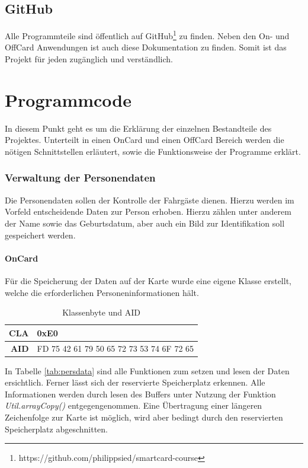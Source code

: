 \documentclass[	a4paper,
			11pt,
			oneside,
			parskip]{scrartcl}
\begin{document}
\subsection{GitHub}

Alle Programmteile sind öffentlich auf GitHub\footnote{https://github.com/philippsied/smartcard-course} zu finden. Neben den On- und OffCard Anwendungen ist auch diese Dokumentation  zu finden. Somit ist das Projekt für jeden zugänglich und verständlich.

\section{Programmcode}

In diesem Punkt geht es um die Erklärung der einzelnen Bestandteile des Projektes. Unterteilt in einen OnCard und einen OffCard Bereich werden die nötigen Schnittstellen erläutert, sowie die Funktionsweise der Programme erklärt. 

\subsubsection{Verwaltung der Personendaten}

Die Personendaten sollen der Kontrolle der Fahrgäste dienen. Hierzu werden im Vorfeld entscheidende Daten zur Person erhoben. Hierzu zählen unter anderem der Name sowie das Geburtsdatum, aber auch ein Bild zur Identifikation soll gespeichert werden.

\paragraph{OnCard} Für die Speicherung der Daten auf der Karte wurde eine eigene  Klasse erstellt, welche die erforderlichen Personeninformationen hält.

\begin{table}[htbp]
  \centering
  \caption{Klassenbyte und AID}
    \begin{tabular}{rr}
    \toprule
    \textbf{CLA} & \multicolumn{1}{l}{0xE0} \\
    \midrule
    \textbf{AID} & FD 75 42 61 79 50 65 72 73 53 74 6F 72 65 \\
    \bottomrule
    \end{tabular}%
  \label{tab:addlabel}%
\end{table}%

In Tabelle \ref{tab:persdata} sind alle Funktionen zum setzen und lesen der Daten ersichtlich. Ferner lässt sich der reservierte Speicherplatz erkennen. Alle Informationen werden durch lesen des Buffers unter Nutzung der Funktion \textit{Util.arrayCopy()} entgegengenommen. Eine Übertragung einer längeren Zeichenfolge zur Karte ist möglich, wird aber bedingt durch den reservierten Speicherplatz abgeschnitten.
\end{document}

